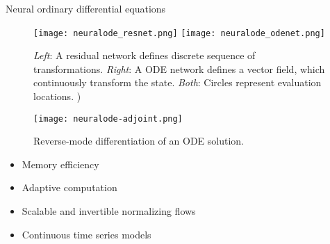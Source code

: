 \begin{frame}[allowframebreaks]{Neural ordinary differential equations}
    \framebreak

    \begin{figure}[h]
        \centering
        \texttt{[image: neuralode\_resnet.png]}
        \texttt{[image: neuralode\_odenet.png]}
        \caption[Comparison between NeuralODE output and normal ANN output]{\textit{Left}: A residual network defines discrete sequence of transformations. \textit{Right}: A ODE network defines a vector field, which continuously transform the state. \textit{Both}: Circles represent evaluation locations. \cite{chenNeuralOrdinaryDifferential2019})}
        \label{fig:resnet-vs-odenet}
    \end{figure}

    \framebreak

    \begin{figure}[h]
        \centering
        \texttt{[image: neuralode-adjoint.png]}
        \caption[Illustration of NeuralODE reverse-mode automatic differentiation]{Reverse-mode differentiation of an ODE solution. \cite{chenNeuralOrdinaryDifferential2019}}
        \label{fig:neuralode-adjoint}
    \end{figure}

    \framebreak

    \begin{itemize}
        \item Memory efficiency
        \item Adaptive computation
        \item Scalable and invertible normalizing flows
        \item Continuous time series models
    \end{itemize}

\end{frame}





